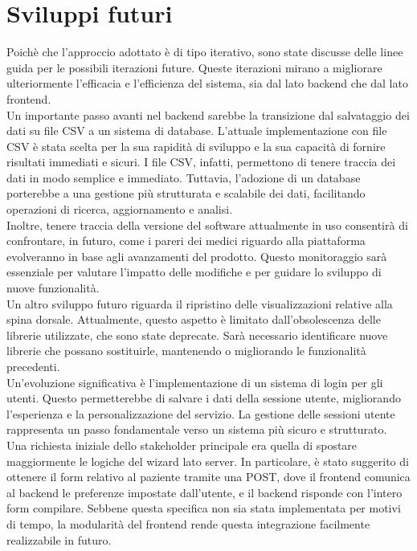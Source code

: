\chapter{Sviluppi futuri}
\label{cap:sviluppi-futuri}

Poichè che l'approccio adottato è di tipo iterativo, sono state discusse delle linee guida per le possibili iterazioni future. Queste iterazioni mirano a migliorare ulteriormente l'efficacia e l'efficienza del sistema, sia dal lato backend che dal lato frontend.\\

Un importante passo avanti nel backend sarebbe la transizione dal salvataggio dei dati su file CSV a un sistema di database. L'attuale implementazione con file CSV è stata scelta per la sua rapidità di sviluppo e la sua capacità di fornire risultati immediati e sicuri. I file CSV, infatti, permettono di tenere traccia dei dati in modo semplice e immediato. Tuttavia, l'adozione di un database porterebbe a una gestione più strutturata e scalabile dei dati, facilitando operazioni di ricerca, aggiornamento e analisi.\\
Inoltre, tenere traccia della versione del software attualmente in uso consentirà di confrontare, in futuro, come i pareri dei medici riguardo alla piattaforma evolveranno in base agli avanzamenti del prodotto. Questo monitoraggio sarà essenziale per valutare l'impatto delle modifiche e per guidare lo sviluppo di nuove funzionalità.\\
Un altro sviluppo futuro riguarda il ripristino delle visualizzazioni relative alla spina dorsale. Attualmente, questo aspetto è limitato dall'obsolescenza delle librerie utilizzate, che sono state deprecate. Sarà necessario identificare nuove librerie che possano sostituirle, mantenendo o migliorando le funzionalità precedenti.\\

Un'evoluzione significativa è l'implementazione di un sistema di login per gli utenti. Questo permetterebbe di salvare i dati della sessione utente, migliorando l'esperienza e la personalizzazione del servizio. La gestione delle sessioni utente rappresenta un passo fondamentale verso un sistema più sicuro e strutturato.\\

Una richiesta iniziale dello stakeholder principale era quella di spostare maggiormente le logiche del wizard lato server. In particolare, è stato suggerito di ottenere il form relativo al paziente tramite una POST, dove il frontend comunica al backend le preferenze impostate dall'utente, e il backend risponde con l'intero form compilare. Sebbene questa specifica non sia stata implementata per motivi di tempo, la modularità del frontend rende questa integrazione facilmente realizzabile in futuro.\\

